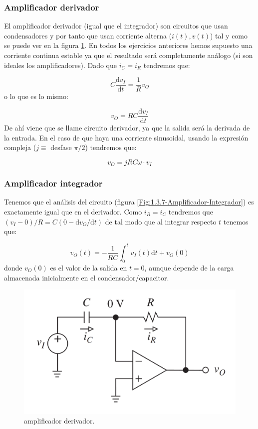 \documentclass[12pt,a4paper]{article}
\numberwithin{equation}{section}
\numberwithin{figure}{section}
\newcommand{\D}{\mathrm{d}}
\begin{document}
\subsubsection{Amplificador derivador}
El amplificador derivador (igual que el integrador) son circuitos que usan condensadores y por tanto que usan corriente alterna ($i(t),v(t)$) tal y como se puede ver en la figura \ref{Fig:1.3.6.-Amplificador-Derivador}. En todos los ejercicios anteriores hemos supuesto una corriente continua estable ya que el resultado será completamente análogo (si son ideales los amplificadores). Dado que $i_C=i_R$ tendremos que:

\begin{equation}
C \dfrac{\D v_I}{\D t} = \dfrac{1}{R}  v_O 
\end{equation}
o lo que es lo mismo:

\begin{equation}
v_O = RC \dfrac{\D v_I}{\D t}
\end{equation}
De ahí viene que se llame circuito derivador, ya que la salida será la derivada de la entrada. En el caso de que haya una corriente sinusoidal, usando la expresión compleja ($j \equiv $ desfase $\pi/2$) tendremos que:

\begin{equation}
v_O = jRC \omega  \cdot v_I  
\end{equation}


\subsubsection{Amplificador integrador}

Tenemos que el análisis del circuito (figura \ref{Fig:1.3.7-Amplificador-Integrador}) es exactamente igual que en el derivador. Como $i_R = i_C$ tendremos que $(v_I-0) / R = C  (0-\D v_O / \D t)$ de tal modo que al integrar respecto $t$ tenemos que:

\begin{equation}
v_O (t) = - \dfrac{1}{RC} \int_{0}^t v_I (t) \D t + v_O (0)
\end{equation}
donde $v_O (0)$ es el valor de la salida en $t=0$, aunque depende de la carga almacenada inicialmente en el condensador/capacitor. 


\begin{figure}[h!] \centering
\includegraphics[scale=0.3]{1.3.6-Derivador.png}
\caption{amplificador derivador.}
\label{Fig:1.3.6.-Amplificador-Derivador}
\end{figure} 
\end{document}
